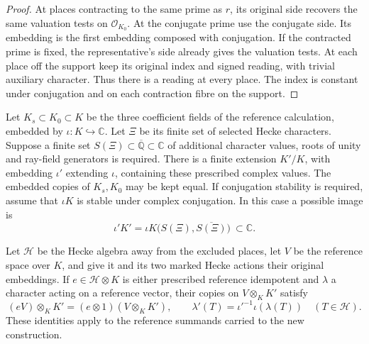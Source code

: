 \begin{proof}
At places contracting
to the same prime as \(r\), its original side recovers the same
valuation tests on \(\mathcal O_{K_0}\). At the conjugate prime
use the conjugate side. Its embedding is the first embedding
composed with conjugation. If the contracted prime is fixed,
the representative's side already gives the valuation tests.
At each place off the support keep its original index and
signed reading, with trivial auxiliary character. Thus there
is a reading at every place. The index is constant under
conjugation and on each contraction fibre on the support.
\end{proof}

\begin{auxlemma}\label{lem:reference-field-transport}
Let \(K_s\subset K_0\subset K\) be the three coefficient fields of
the reference calculation, embedded by \(\iota:K\hookrightarrow\mathbb C\).
Let \(\Xi\) be its finite set of selected Hecke characters. Suppose a
finite set \(S(\Xi)\subset\overline{\mathbb Q}\subset\mathbb C\) of
additional character values, roots of unity and ray-field generators
is required. There is a finite extension \(K'/K\), with embedding
\(\iota'\) extending \(\iota\), containing these prescribed complex
values. The embedded copies of \(K_s,K_0\) may be kept equal. If
conjugation stability is required, assume that \(\iota K\) is stable
under complex conjugation. In this case a possible image is
\[
    \iota'K'=\iota K\bigl(S(\Xi),\overline{S(\Xi)}\bigr)
                           \ \subset\mathbb C .
\]

Let \(\mathcal H\) be the Hecke algebra away from the excluded
places, let \(V\) be the reference space over \(K\), and give it and
its two marked Hecke actions their original embeddings. If
\(e\in\mathcal H\otimes K\) is either prescribed reference idempotent
and \(\lambda\) a character acting on a reference vector, their copies
on \(V\otimes_K K'\) satisfy
\[
  (eV)\otimes_K K'=(e\otimes1)(V\otimes_KK'),\qquad
  \lambda'(T)=\iota'^{-1}\iota(\lambda(T))
                  \quad(T\in\mathcal H).
\]
These identities apply to the reference summands carried to the new
construction.
\end{auxlemma}
